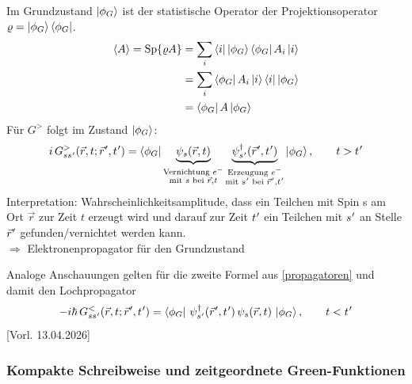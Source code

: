Im Grundzustand $\left|\phi_G\right\rangle$ ist der statistische Operator der Projektionsoperator $\varrho =
  \left|\phi_G\right\rangle\left\langle\phi_G\right|$.
\begin{equation}
  \begin{aligned}
    \left\langle A\right\rangle
    = \mathrm{Sp}\{\varrho A\}
     & = \sum_i \left\langle i\right|\left|\phi_G\right\rangle\left\langle\phi_G\right| A_i\left|i\right\rangle \\
     & = \sum_i \left\langle\phi_G\right| A_i\left|i\right\rangle\left\langle i\right|\left|\phi_G\right\rangle \\
     & = \left\langle\phi_G\right| A\left|\phi_G\right\rangle
  \end{aligned}
\end{equation}
Für $G^{>}$ folgt im Zustand $\left|\phi_G\right\rangle$:
\begin{equation}
  \begin{aligned}
    i\,G^{>}_{ss\mkern1mu'}(\vec{r},t; \vec{r}\mkern1mu',t\mkern1mu')
    = \left\langle\phi_G\right|
    \underbrace{\psi_s(\vec{r},t)}_{\substack{\text{Vernichtung }e^-                                       \\\text{mit }s\text{ bei }\vec{r},t}}
    \underbrace{\psi^\dagger_{s\mkern1mu'}(\vec{r}\mkern1mu',t\mkern1mu')}_{\substack{\text{Erzeugung }e^- \\\text{mit }s\mkern1mu'\text{ bei }\vec{r}\mkern1mu',t\mkern1mu'}}
    \left|\phi_G\right\rangle,
    \qquad t>t\mkern1mu'
  \end{aligned}
\end{equation}
Interpretation:
Wahrscheinlichkeitsamplitude, dass ein Teilchen mit Spin s am Ort $\vec{r}$ zur Zeit $t$ erzeugt wird und darauf zur Zeit $t\mkern1mu'$ ein Teilchen mit $s\mkern1mu'$ an Stelle $\vec{r}\mkern1mu'$ gefunden/vernichtet werden kann.\\
$\Rightarrow$ Elektronenpropagator für den Grundzustand

Analoge Anschauungen gelten für die zweite Formel aus \ref{propagatoren} und damit den Lochpropagator
\begin{equation}
  -i\hbar\,G^{<}_{ss\mkern1mu'}(\vec{r},t;\vec{r}\mkern1mu',t\mkern1mu')
  = \left\langle\phi_G\right|\,\psi^\dagger_{s\mkern1mu'}(\vec{r}\mkern1mu',t\mkern1mu')\,\psi_s(\vec{r},t)\,\left|\phi_G\right\rangle,
  \qquad t<t\mkern1mu'
\end{equation}
[Vorl. 13.04.2026]

\subsubsection*{Kompakte Schreibweise und zeitgeordnete Green-Funktionen}

